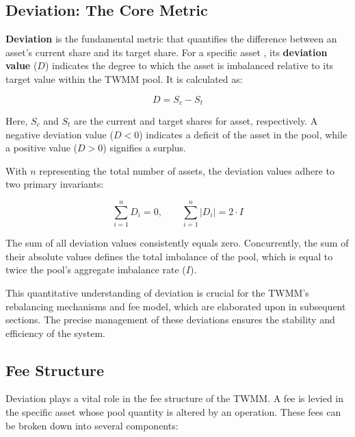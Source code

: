 \subsection{Deviation: The Core Metric}

\textbf{Deviation} is the fundamental metric that quantifies the difference between an asset's current share and its target share. For a specific asset , its \textbf{deviation value} ($D$) indicates the degree to which the asset is imbalanced relative to its target value within the TWMM pool. It is calculated as:

\begin{equation}
	\label{eq:deviation}
	D = S_{c} - S_{t}
\end{equation}

Here, $S_{c}$ and $S_{t}$ are the current and target shares for asset, respectively. A negative deviation value ($D < 0$) indicates a deficit of the asset in the pool, while a positive value ($D > 0$) signifies a surplus.

With $n$ representing the total number of assets, the deviation values adhere to two primary invariants:

\begin{equation}
	\label{eq:invariant_deviation}
	\sum_{i=1}^{n} D_i = 0, \qquad \sum_{i=1}^{n} |D_i| = 2 \cdot I
\end{equation}

The sum of all deviation values consistently equals zero. Concurrently, the sum of their absolute values defines the total imbalance of the pool, which is equal to twice the pool's aggregate imbalance rate ($I$).

This quantitative understanding of deviation is crucial for the TWMM's rebalancing mechanisms and fee model, which are elaborated upon in subsequent sections. The precise management of these deviations ensures the stability and efficiency of the system.

\subsection{Fee Structure}

Deviation plays a vital role in the fee structure of the TWMM. A fee is levied in the specific asset whose pool quantity is altered by an operation. These fees can be broken down into several components:

